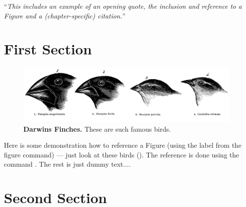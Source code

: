 ``\textit{This includes an example of an opening quote, the inclusion and reference to a Figure and a (chapter-specific) citation.}''\\

\begin{multicols}{2}
\section{First Section}

\begin{figure}[!hb] %
\centering
\includegraphics[width = \fwidth]{figures/ci/finches.png}
\caption[Darwins Finches]{\label{fig:cif1}\textbf{Darwins Finches.} These are such famous birds.
}
\end{figure}

Here is some demonstration how to reference a Figure (using the label from the figure command) --- just look at these birds ().
The reference is done using the command .
The rest is just dummy text....

\lipsum[1-4]

\section{Second Section}

\lipsum[5-6]

\end{multicols}
